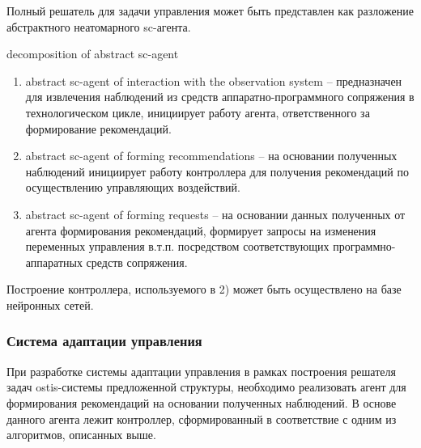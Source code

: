 Полный решатель для задачи управления может быть представлен как разложение абстрактного неатомарного sc-агента.


\begin{SCn}
\begin{scnrelfromset}{decomposition of abstract sc-agent}
\end{scnrelfromset}
\end{SCn}

\begin{enumerate}
    \item abstract sc-agent of interaction with the observation system – предназначен для извлечения наблюдений из средств аппаратно-программного сопряжения в технологическом цикле, инициирует работу агента, ответственного за формирование рекомендаций.
    \item abstract sc-agent of forming recommendations – на основании полученных наблюдений инициирует работу контроллера для получения рекомендаций по осуществлению управляющих воздействий.
    \item abstract sc-agent of forming requests – на основании данных полученных от агента формирования рекомендаций, формирует запросы на  изменения переменных управления в.т.п. посредством соответствующих программно-аппаратных средств сопряжения.

\end{enumerate}

Построение контроллера, используемого в 2) может быть осуществлено на базе нейронных сетей.



\subsubsection{Система адаптации управления}
\label{sec_chapter_enterprise_control_adaptation_system}


При разработке  системы адаптации управления в рамках построения решателя задач ostis-системы предложенной структуры, необходимо реализовать агент для формирования рекомендаций на основании полученных наблюдений. В основе данного агента лежит контроллер, сформированный в соответствие с одним из алгоритмов, описанных выше.



